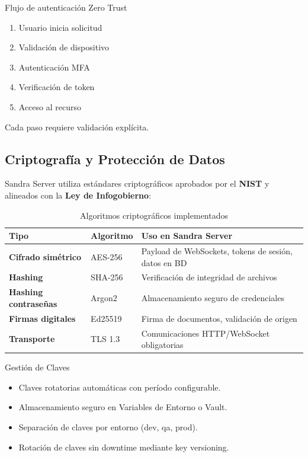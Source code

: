 \begin{caja}{Flujo de autenticación Zero Trust}
\begin{enumerate}
\item Usuario inicia solicitud
\item Validación de dispositivo
\item Autenticación MFA
\item Verificación de token
\item Acceso al recurso
\end{enumerate}
Cada paso requiere validación explícita.
\end{caja}

\subsection{Criptografía y Protección de Datos}

Sandra Server utiliza estándares criptográficos aprobados por el \textbf{NIST} y alineados con la \textbf{Ley de Infogobierno}:

\begin{table}[H]
\centering
\caption{Algoritmos criptográficos implementados}
\begin{tabular}{|l|l|p{6cm}|}
\hline
\textbf{Tipo} & \textbf{Algoritmo} & \textbf{Uso en Sandra Server} \\ \hline
\textbf{Cifrado simétrico} & AES-256 & Payload de WebSockets, tokens de sesión, datos en BD \\ \hline
\textbf{Hashing} & SHA-256 & Verificación de integridad de archivos \\ \hline
\textbf{Hashing contraseñas} & Argon2 & Almacenamiento seguro de credenciales \\ \hline
\textbf{Firmas digitales} & Ed25519 & Firma de documentos, validación de origen \\ \hline
\textbf{Transporte} & TLS 1.3 & Comunicaciones HTTP/WebSocket obligatorias \\ \hline
\end{tabular}
\end{table}

\begin{caja}{Gestión de Claves}
\begin{itemize}
\item Claves rotatorias automáticas con período configurable.
\item Almacenamiento seguro en Variables de Entorno o Vault.
\item Separación de claves por entorno (dev, qa, prod).
\item Rotación de claves sin downtime mediante key versioning.
\end{itemize}
\end{caja}

